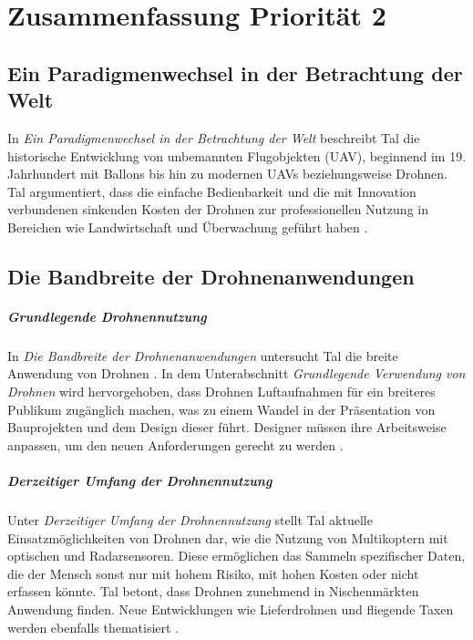 \chapter{Zusammenfassung Priorität 2}\label{ch:summary1}

\section{Ein Paradigmenwechsel in der Betrachtung der Welt}
In \textit{Ein Paradigmenwechsel in der Betrachtung der Welt} beschreibt Tal die historische Entwicklung von unbemannten Flugobjekten (UAV), beginnend im 19. Jahrhundert mit Ballons bis hin zu modernen UAVs beziehungsweise Drohnen.
Tal argumentiert, dass die einfache Bedienbarkeit und die mit Innovation verbundenen sinkenden Kosten der Drohnen zur professionellen Nutzung in Bereichen wie Landwirtschaft und Überwachung geführt haben \cite[S. 11]{Tal2021}.

\section{Die Bandbreite der Drohnenanwendungen}
\paragraph{Grundlegende Drohnennutzung}
In \textit{Die Bandbreite der Drohnenanwendungen} untersucht Tal die breite Anwendung von Drohnen \cite[S. 12]{Tal2021}.
In dem Unterabschnitt \textit{Grundlegende Verwendung von Drohnen} wird hervorgehoben, dass Drohnen Luftaufnahmen für ein breiteres Publikum zugänglich machen, was zu einem Wandel in der Präsentation von Bauprojekten und dem Design dieser führt.
Designer müssen ihre Arbeitsweise anpassen, um den neuen Anforderungen gerecht zu werden \cite[S. 12]{Tal2021}.

\paragraph{Derzeitiger Umfang der Drohnennutzung}
Unter \textit{Derzeitiger Umfang der Drohnennutzung} stellt Tal aktuelle Einsatzmöglichkeiten von Drohnen dar, wie die Nutzung von Multikoptern mit optischen und Radarsensoren.
Diese ermöglichen das Sammeln spezifischer Daten, die der Mensch sonst nur mit hohem Risiko, mit hohen Kosten oder nicht erfassen könnte.
Tal betont, dass Drohnen zunehmend in Nischenmärkten Anwendung finden.
Neue Entwicklungen wie Lieferdrohnen und fliegende Taxen werden ebenfalls thematisiert \cite[S. 13-15]{Tal2021}.

